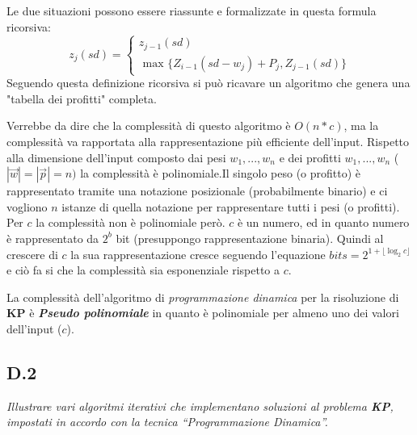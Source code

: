 \documentclass[a4paper]{article}
\newcommand{\imp}[1]{\textbf{\textit{#1}}}
\begin{document}
Le due situazioni possono essere riassunte e formalizzate in questa formula ricorsiva:
\begin{equation*}
	z_j(sd)= \begin{cases} z_{j-1}(sd)\\ 
	\text{ max } \{ Z_{i-1}(sd - w_j) + P_j , Z_{j-1}(sd) \}
\end{cases}
\end{equation*}
Seguendo questa definizione ricorsiva si può ricavare un algoritmo che genera una "tabella dei profitti" completa.

Verrebbe da dire che la complessità di questo algoritmo è $O(n*c)$, ma la complessità va rapportata alla rappresentazione più efficiente dell'input.
Rispetto alla dimensione dell'input composto dai pesi $w_1, ..., w_n$ e dei profitti $w_1, ... , w_n$ ($| \vec w | = | \vec p | = n)$ la complessità è polinomiale.Il singolo peso (o profitto) è rappresentato tramite una notazione posizionale (probabilmente binario) e ci vogliono $n$ istanze di quella notazione per rappresentare tutti i pesi (o profitti).\\
Per $c$ la complessità non è polinomiale però. $c$ è un numero, ed in quanto numero è rappresentato da $2^b$ bit (presuppongo rappresentazione binaria).
Quindi al crescere di $c$ la sua rappresentazione cresce seguendo l'equazione $bits = 2^{1 + \lfloor \log_2c \rfloor}$ e ciò fa si che la complessità sia esponenziale rispetto a $c$.

La complessità dell'algoritmo di \textit{programmazione dinamica} per la risoluzione di \textbf{KP} è \imp{Pseudo polinomiale} in quanto è polinomiale per almeno uno dei valori dell'input ($c$).

\subsection{D.2}
\emph{Illustrare vari algoritmi iterativi che implementano soluzioni al problema \textbf{KP}, impostati in accordo con la tecnica “Programmazione Dinamica”.}
\end{document}
